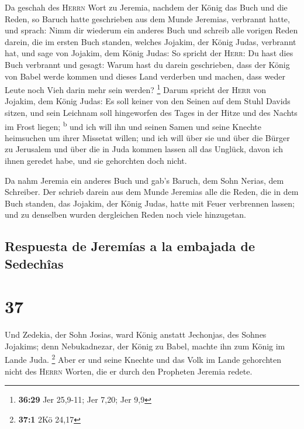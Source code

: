  Da geschah des \textsc{Herrn} Wort zu Jeremia, nachdem
der König das Buch und die Reden, so Baruch hatte geschrieben aus dem
Munde Jeremias, verbrannt hatte, und sprach:  Nimm dir
wiederum ein anderes Buch und schreib alle vorigen Reden darein, die im
ersten Buch standen, welches Jojakim, der König Judas, verbrannt hat,
 und sage von Jojakim, dem König Judas: So spricht der
\textsc{Herr}: Du hast dies Buch verbrannt und gesagt: Warum hast du
darein geschrieben, dass der König von Babel werde kommen und dieses
Land verderben und machen, dass weder Leute noch Vieh darin mehr sein
werden? \footnote{\textbf{36:29} Jer 25,9-11; Jer 7,20; Jer 9,9}
 Darum spricht der \textsc{Herr} von Jojakim, dem König
Judas: Es soll keiner von den Seinen auf dem Stuhl Davids sitzen, und
sein Leichnam soll hingeworfen des Tages in der Hitze und des Nachts im
Frost liegen; \textsuperscript{b}  und ich will ihn und
seinen Samen und seine Knechte heimsuchen um ihrer Missetat willen; und
ich will über sie und über die Bürger zu Jerusalem und über die in Juda
kommen lassen all das Unglück, davon ich ihnen geredet habe, und sie
gehorchten doch nicht.

 Da nahm Jeremia ein anderes Buch und gab's Baruch, dem
Sohn Nerias, dem Schreiber. Der schrieb darein aus dem Munde Jeremias
alle die Reden, die in dem Buch standen, das Jojakim, der König Judas,
hatte mit Feuer verbrennen lassen; und zu denselben wurden dergleichen
Reden noch viele hinzugetan.

\hypertarget{respuesta-de-jeremuxedas-a-la-embajada-de-sedechuxeeas}{%
\subsection{Respuesta de Jeremías a la embajada de
Sedechîas}\label{respuesta-de-jeremuxedas-a-la-embajada-de-sedechuxeeas}}

\hypertarget{section-36}{%
\section{37}\label{section-36}}

 Und Zedekia, der Sohn Josias, ward König anstatt
Jechonjas, des Sohnes Jojakims; denn Nebukadnezar, der König zu Babel,
machte ihn zum König im Lande Juda. \footnote{\textbf{37:1} 2Kö 24,17}
 Aber er und seine Knechte und das Volk im Lande
gehorchten nicht des \textsc{Herrn} Worten, die er durch den Propheten
Jeremia redete.

